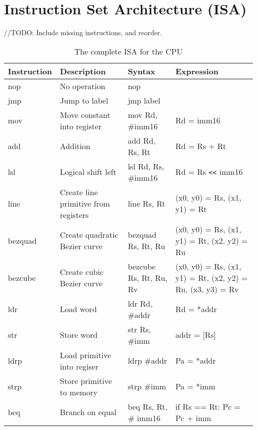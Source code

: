 \chapter{Instruction Set Architecture (ISA)}
\label{app:isa}
//TODO: Include missing instructions, and reorder.
\begin{table}[H]
    \begin{tabular}{|p{2cm}|p{5cm}|p{4cm}|p{3cm}|}
    \hline
    Instruction & Description                          & Syntax                 & Expression                                                 \\ \hline
    nop         & No operation                         & nop                    & ~                                                          \\ \hline
    jmp         & Jump to label                        & jmp label              & ~                                                          \\ \hline
    mov         & Move constant into register          & mov Rd, \#imm16        & Rd = imm16                                                 \\ \hline
    add         & Addition                             & add Rd, Rs, Rt         & Rd = Rs + Rt                                               \\ \hline
    lsl         & Logical shift left                   & lsl Rd, Rs, \#imm16    & Rd = Rs \verb|<<| imm16                                           \\ \hline
    line        & Create line primitive from registers & line Rs, Rt            & (x0, y0) = Rs, (x1, y1) = Rt                               \\ \hline
    bezquad     & Create quadratic Bezier curve        & bezquad Rs, Rt, Ru     & (x0, y0) = Rs, (x1, y1) = Rt, (x2, y2) = Ru                \\ \hline
    bezcube     & Create cubic Bezier curve            & bezcube Rs, Rt, Ru, Rv & (x0, y0) = Rs, (x1, y1) = Rt, (x2, y2) = Ru, (x3, y3) = Rv \\ \hline
    ldr         & Load word                            & ldr Rd, \#addr         & Rd = *addr                                                 \\ \hline
    str         & Store word                           & str Rs, \#imm          & addr = [Rs]                                                \\ \hline
    ldrp        & Load primitive into regiser          & ldrp \#addr            & Pa = *addr                                                 \\ \hline
    strp        & Store primitive to memory            & strp \#imm             & Pa = *imm                                                  \\ \hline
    beq         & Branch on equal                      & beq Rs, Rt, \# imm16   & if Rs == Rt: Pc = Pc + imm                            \\ \hline
    \end{tabular}
    \caption{The complete ISA for the CPU}
\end{table}
